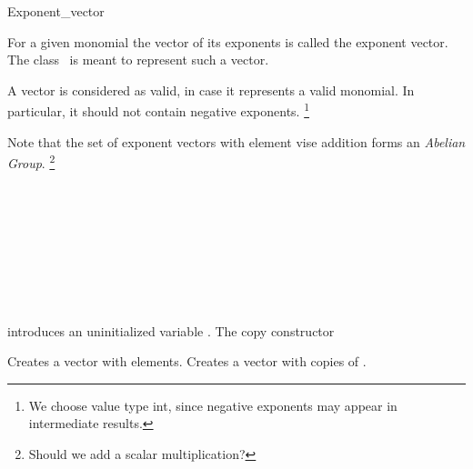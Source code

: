\begin{ccRefClass}{Exponent_vector}

\ccDefinition

For a given monomial the vector of its exponents is called the 
exponent vector. The class \ccClassName\ is meant to represent 
such a vector.

A vector is considered as valid, in case it represents a valid monomial. 
In particular, it should not contain negative exponents. 
\footnote{We choose value type int, since negative exponents may appear in intermediate results. }

Note that the set of exponent vectors with element vise 
addition forms an {\em Abelian Group}. 
\footnote{Should we add a scalar multiplication? }



\ccInheritsFrom
{}

\ccIsModel

\\
\\

\\
\\
\\

\\
\\

\ccCreation
{}

        {introduces an uninitialized variable \ccVar.
        }\ccGlue
        {The copy constructor
        }\ccGlue

        {Creates a vector with  elements.
        }\ccGlue
{} 
        {Creates a vector with  copies of . 
        }\ccGlue

\ccGlue


\end{ccRefClass}
